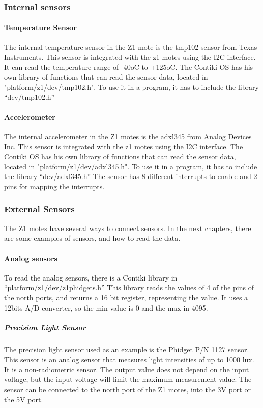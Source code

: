 \subsubsection{Internal sensors}

\paragraph{Temperature Sensor}
The internal temperature sensor in the Z1 mote is the tmp102 sensor from Texas Instruments.
This sensor is integrated with the z1 motes using the I2C interface.
It can read the temperature range of -40oC to +125oC.
The Contiki OS has his own library of functions that can read the sensor data,
	located in "platform/z1/dev/tmp102.h".
To use it in a program,
	it has to include the library “dev/tmp102.h” 

\paragraph{Accelerometer}
The internal accelerometer in the Z1 motes is the adxl345 from Analog Devices Inc.
This sensor is integrated with the z1 motes using the I2C interface.
The Contiki OS has his own library of functions that can read the sensor data,
	located in "platform/z1/dev/adxl345.h".
To use it in a program,
	it has to include the library “dev/adxl345.h” The sensor has 8 different interrupts to enable and 2 pins for mapping the interrupts.

\subsubsection{External Sensors}
The Z1 motes have several ways to connect sensors.
In the next chapters,
	there are some examples of sensors,
	and how to read the data.

\paragraph{Analog sensors}

To read the analog sensors,
	there is a Contiki library in “platform/z1/dev/z1phidgets.h” This library reads the values of 4 of the pins of the north ports,
	and returns a 16 bit register,
	representing the value.
It uses a 12bits A/D converter,
	so the min value is 0 and the max in 4095.


\subparagraph{Precision Light Sensor}
The precision light sensor used as an example is the Phidget P/N 1127 sensor.
This sensor is an analog sensor that measures light intensities of up to 1000 lux.
It is a non-radiometric sensor.
The output value does not depend on the input voltage,
	but the input voltage will limit the maximum measurement value.
The sensor can be connected to the north port of the Z1 motes,
	into the 3V port or the 5V port.

